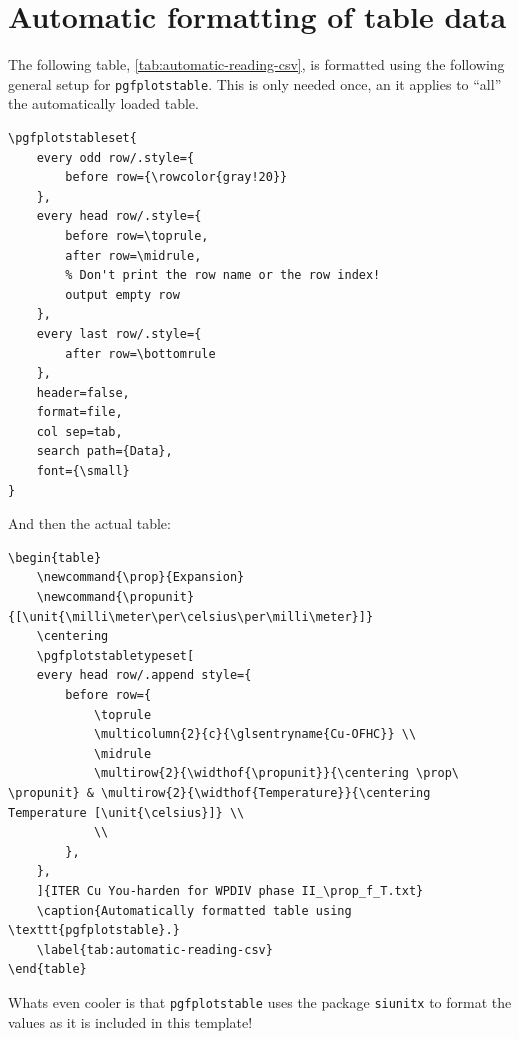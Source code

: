 \section{Automatic formatting of table data}

The following table, \cref{tab:automatic-reading-csv}, is formatted using the following general setup for \verb|pgfplotstable|. This is only needed once, an it applies to ``all'' the automatically loaded table.

\begin{lstlisting}[language={[LaTeX]TeX}]
% Configure the general setting of pgfplotstable
\pgfplotstableset{
	every odd row/.style={
		before row={\rowcolor{gray!20}}
	},
	every head row/.style={
		before row=\toprule,
		after row=\midrule,
		% Don't print the row name or the row index!
		output empty row
	},
	every last row/.style={
		after row=\bottomrule
	},
	header=false,
	format=file,
	col sep=tab,
	search path={Data},
	font={\small}
}
\end{lstlisting}

And then the actual table:
\begin{lstlisting}[language={[LaTeX]TeX}]
\begin{table}
	\newcommand{\prop}{Expansion}
	\newcommand{\propunit}{[\unit{\milli\meter\per\celsius\per\milli\meter}]}
	\centering
	\pgfplotstabletypeset[
	every head row/.append style={
		before row={
			\toprule
			\multicolumn{2}{c}{\glsentryname{Cu-OFHC}} \\
			\midrule
			\multirow{2}{\widthof{\propunit}}{\centering \prop\ \propunit} & \multirow{2}{\widthof{Temperature}}{\centering Temperature [\unit{\celsius}]} \\
			\\
		},
	},
	]{ITER Cu You-harden for WPDIV phase II_\prop_f_T.txt}
	\caption{Automatically formatted table using \texttt{pgfplotstable}.}
	\label{tab:automatic-reading-csv}
\end{table}
\end{lstlisting}

Whats even cooler is that \verb|pgfplotstable| uses the package \verb|siunitx| to format the values as it is included in this template!


